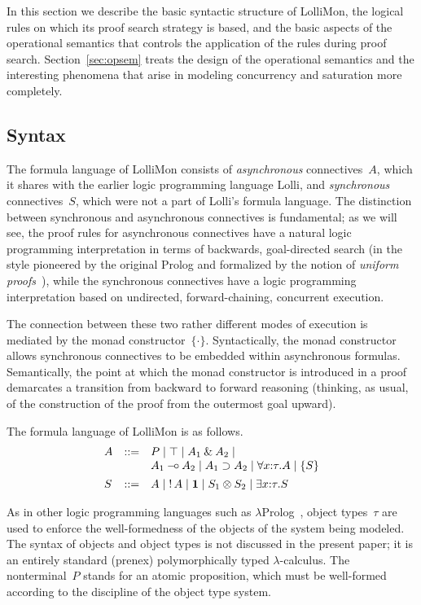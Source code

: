\documentclass{sig-alt}
\begin{document}
In this section
 we describe the basic syntactic structure of LolliMon,
the logical rules on which its proof search strategy is based, and the
basic aspects of the operational semantics that controls the application of
the rules during proof search. Section~\ref{sec:opsem} treats the design
of the operational semantics and the interesting phenomena that arise
in modeling concurrency and saturation more completely.

\subsection{Syntax}
The formula language of LolliMon consists of \emph{asynchronous}
connectives~$A$, which it shares with the earlier logic programming
language Lolli, and \emph{synchronous} connectives~$S$, which were not
a part of Lolli's formula language.  The distinction between
synchronous and asynchronous connectives is fundamental; as we will
see, the proof rules for asynchronous connectives have a natural logic
programming interpretation in terms of backwards, goal-directed search
(in the style pioneered by the original Prolog and formalized by the
notion of \emph{uniform proofs}~\cite{Miller91apal}), while the
synchronous connectives have a logic programming interpretation based
on undirected, forward-chaining, concurrent execution.

The connection between these two rather different modes of execution is
mediated by the monad constructor~$\{\cdot\}$. Syntactically, the monad
constructor allows synchronous connectives to be embedded within
asynchronous formulas. Semantically, the point at which the monad
constructor is introduced in a proof demarcates a transition from
backward to forward reasoning (thinking, as usual, of the construction
of the proof from the outermost goal upward).

The formula language of LolliMon is as follows.
$$
\begin{array}{lll}
A & ::= &  P 
      \mid \top 
      \mid A_1 \mathbin{\&} A_2 
      \mid \\&& A_1 \mathbin{-\hspace{-0.70mm}\circ} A_2 
      \mid A_1 \supset A_2 
      \mid \forall x{:}\tau.A  
      \mid \{ S \} 
\\[1ex]
S & ::= &  A
      \mid \mathop{!} A
      \mid \textbf{1} 
      \mid S_1 \otimes S_2 
      \mid \exists x{:}\tau.S 
\end{array}
$$

As in other logic programming languages such as
$\lambda$Prolog~\cite{Miller86iclp}, object types~$\tau$ are used to
enforce the well-formedness of the objects of the system being
modeled.
The syntax of objects and object types is not discussed in the present
paper; it is an entirely standard (prenex) polymorphically typed
$\lambda$-calculus.  The nonterminal~$P$ stands for an atomic proposition,
which must be well-formed according to the discipline of the object type system.
\end{document}
